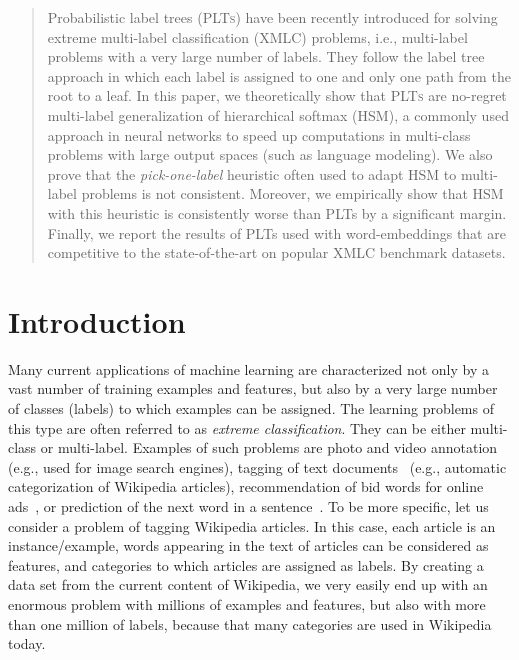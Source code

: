 \documentclass{article}
\newcommand{\Algo}[1]{\textsc{#1}}
\begin{document}
\printAffiliationsAndNotice{\icmlEqualContribution} %

\begin{abstract}
Probabilistic label trees (\Algo{PLTs}) have been recently introduced for solving extreme multi-label classification (XMLC) problems, i.e., multi-label problems with a very large number of labels. 
They follow the label tree approach in which each label is assigned to one and only one path from the root to a leaf. 
%
In this paper, we theoretically show that \Algo{PLTs} are no-regret multi-label generalization of hierarchical softmax (\Algo{HSM}), a commonly used approach in neural networks to speed up computations in multi-class problems with large output spaces (such as language modeling). We also prove that the \emph{pick-one-label} heuristic often used to adapt HSM to multi-label problems is not consistent. Moreover, we empirically show that HSM with this heuristic is consistently worse than PLTs by a significant margin. Finally, we report the results of PLTs used with word-embeddings that are competitive to the state-of-the-art on popular XMLC benchmark datasets. 
\end{abstract}

\section{Introduction}
\label{sec:introduction}

Many current applications of machine learning are characterized not only by a vast number of training examples and features, but also by a very large number of classes (labels) to which examples can be assigned. The learning problems of this type are often referred to as \emph{extreme classification}. They can be either multi-class or multi-label. Examples of such problems are photo and video annotation~\citep{Deng_et_al_2011} (e.g., used for image search engines), tagging of text documents~\citep{Dekel_Shamir_2010} (e.g., automatic categorization of Wikipedia articles), recommendation of bid words for online ads~\citep{Prabhu_Varma_2014}, or prediction of the next word in a sentence~\citep{Mikolov_et_al_2013}.
%
To be more specific, let us consider a problem of tagging Wikipedia articles. In this case, each article is an instance/example, words appearing in the text of articles can be considered as features, and categories to which articles are assigned as labels. By creating a data set from the current content of Wikipedia, we very easily end up with an enormous problem with millions of examples and features, but also with more than one million of labels, because that many categories are used in Wikipedia today. 
\end{document}
